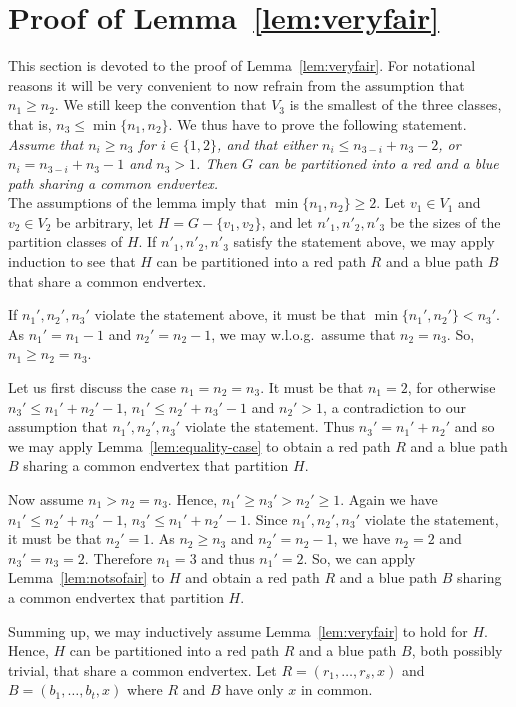 \documentclass[a4paper,10pt]{article}
\begin{document}
\section{Proof of Lemma~\ref{lem:veryfair}}\label{sec:uglylemmaproof}

This section is devoted to the proof of Lemma~\ref{lem:veryfair}. For notational reasons it will be very convenient to now refrain from the assumption that $n_1\geq n_2$. We still keep the convention that $V_3$ is the smallest of the three classes, that is, $n_3\leq\min\{n_1,n_2\}$. We thus have to prove the following statement.\\

\noindent
{\it Assume that $n_i\geq n_3$ for $i\in\{1,2\}$, and that either $n_i \le n_{3-i} + n_3 - 2$, or $n_i=n_{3-i}+n_3-1$ and $n_3>1$.
Then $G$ can be partitioned into a red and a blue path sharing a common endvertex.}\\

The assumptions of the lemma imply that $\min\{n_1,n_2\} \ge 2$.
Let $v_1 \in V_1$ and $v_2 \in V_2$ be arbitrary, let $H=G-\{v_1,v_2\}$, and let $n'_1,n'_2,n'_3$ be the sizes of the partition classes of $H$.
If $n'_1,n'_2,n'_3$ satisfy the statement above, we may apply induction to see that $H$ can be partitioned into a red path $R$ and a blue path $B$ that share a common endvertex.

If $n_1',n_2',n_3'$ violate the statement above, it must be that $\min \{n_1',n_2'\} < n_3'$.
As $n_1'=n_1-1$ and $n_2'=n_2-1$, we may w.l.o.g.~assume that $n_2=n_3$.
So, $n_1 \ge n_2=n_3$.

Let us first discuss the case $n_1=n_2=n_3$.
It must be that $n_1 = 2$, for otherwise $n_3' \le n_1'+n_2'-1$, $n_1' \le n_2'+n_3'-1$ and $n_2'>1$, a contradiction to our assumption that $n_1',n_2',n_3'$ violate the statement.
Thus $n_3' = n_1' + n_2'$ and so we may apply Lemma~\ref{lem:equality-case} to obtain a red path $R$ and a blue path $B$ sharing a common endvertex that partition $H$.

Now assume $n_1 > n_2=n_3$.
Hence, $n_1' \ge n_3' > n_2' \ge 1$.
Again we have $n_1' \le n_2'+n_3'-1$, $n_3' \le n_1'+n_2'-1$.
Since $n_1',n_2',n_3'$ violate the statement, it must be that $n_2'=1$.
As $n_2 \ge n_3$ and $n_2' = n_2-1$, we have $n_2=2$ and $n_3'=n_3=2$.
Therefore $n_1 = 3$ and thus $n_1'=2$.
So, we can apply Lemma~\ref{lem:notsofair} to $H$ and obtain a red path $R$ and a blue path $B$ sharing a common endvertex that partition $H$.

Summing up, we may inductively assume Lemma~\ref{lem:veryfair} to hold for $H$.
Hence, $H$ can be partitioned into a red path $R$ and a blue path $B$, both possibly trivial, that share a common endvertex.
Let $R = (r_1,\ldots,r_s,x)$ and $B = (b_1,\ldots,b_t,x)$ where $R$ and $B$ have only $x$ in common.
\end{document}
